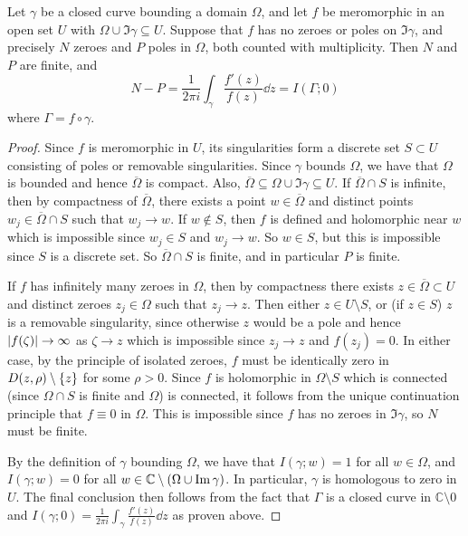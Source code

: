 \begin{corollary}
	Let \( \gamma \) be a closed curve bounding a domain \( \Omega \), and let \( f \) be meromorphic in an open set \( U \) with \( \Omega \cup \Im \gamma \subseteq U \).
	Suppose that \( f \) has no zeroes or poles on \( \Im \gamma \), and precisely \( N \) zeroes and \( P \) poles in \( \Omega \), both counted with multiplicity.
	Then \( N \) and \( P \) are finite, and
	\[ N - P = \frac{1}{2 \pi i} \int_\gamma \frac{f'(z)}{f(z)} \dd{z} = I(\Gamma;0) \]
	where \( \Gamma = f \circ \gamma \).
\end{corollary}
\begin{proof}
	Since \( f \) is meromorphic in \( U \), its singularities form a discrete set \( S \subset U \) consisting of poles or removable singularities.
	Since \( \gamma \) bounds \( \Omega \), we have that \( \Omega \) is bounded and hence \( \overline \Omega \) is compact.
	Also, \( \overline \Omega \subseteq \Omega \cup \Im \gamma \subseteq U \).
	If \( \overline \Omega \cap S \) is infinite, then by compactness of \( \overline \Omega \), there exists a point \( w \in \overline \Omega \) and distinct points \( w_j \in \overline \Omega \cap S \) such that \( w_j \to w \).
	If \( w \not\in S \), then \( f \) is defined and holomorphic near \( w \) which is impossible since \( w_j \in S \) and \( w_j \to w \).
	So \( w \in S \), but this is impossible since \( S \) is a discrete set.
	So \( \overline \Omega \cap S \) is finite, and in particular \( P \) is finite.

	If \( f \) has infinitely many zeroes in \( \Omega \), then by compactness there exists \( z \in \overline \Omega \subset U \) and distinct zeroes \( z_j \in \Omega \) such that \( z_j \to z \).
	Then either \( z \in U \setminus S \), or (if \( z \in S \)) \( z \) is a removable singularity, since otherwise \( z \) would be a pole and hence \( \abs{f(\zeta)} \to \infty \) as \( \zeta \to z \) which is impossible since \( z_j \to z \) and \( f(z_j) = 0 \).
	In either case, by the principle of isolated zeroes, \( f \) must be identically zero in \( D(z,\rho) \setminus \qty{z} \) for some \( \rho > 0 \).
	Since \( f \) is holomorphic in \( \Omega \setminus S \) which is connected (since \( \Omega \cap S \) is finite and \( \Omega \)) is connected, it follows from the unique continuation principle that \( f \equiv 0 \) in \( \Omega \).
	This is impossible since \( f \) has no zeroes in \( \Im \gamma \), so \( N \) must be finite.

	By the definition of \( \gamma \) bounding \( \Omega \), we have that \( I(\gamma;w) = 1 \) for all \( w \in \Omega \), and \( I(\gamma;w) = 0 \) for all \( w \in \mathbb C \setminus \qty(\Omega \cup \Im \gamma) \).
	In particular, \( \gamma \) is homologous to zero in \( U \).
	The final conclusion then follows from the fact that \( \Gamma \) is a closed curve in \( \mathbb C \setminus \qty{0} \) and \( I(\gamma;0) = \frac{1}{2\pi i} \int_\gamma \frac{f'(z)}{f(z)} \dd{z} \) as proven above.
\end{proof}

